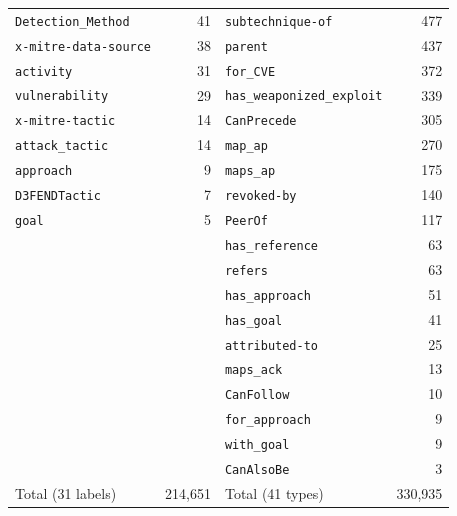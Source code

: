 \documentclass[11pt,a4paper]{article}
\begin{document}
\begin{table}[ht]
\begin{tabular}{@{}lr@{\qquad}lr@{}}
\texttt{Detection\_Method} & 41 & \texttt{subtechnique-of} & 477 \\
\texttt{x-mitre-data-source} & 38 & \texttt{parent} & 437 \\
\texttt{activity} & 31 & \texttt{for\_CVE} & 372 \\
\texttt{vulnerability} & 29 & \texttt{has\_weaponized\_exploit} & 339 \\
\texttt{x-mitre-tactic} & 14 & \texttt{CanPrecede} & 305 \\
\texttt{attack\_tactic} & 14 & \texttt{map\_ap} & 270 \\
\texttt{approach} & 9 & \texttt{maps\_ap} & 175 \\
\texttt{D3FENDTactic} & 7 & \texttt{revoked-by} & 140 \\
\texttt{goal} & 5 & \texttt{PeerOf} & 117 \\
& & \texttt{has\_reference} & 63 \\
& & \texttt{refers} & 63 \\
& & \texttt{has\_approach} & 51 \\
& & \texttt{has\_goal} & 41 \\
& & \texttt{attributed-to} & 25 \\
& & \texttt{maps\_ack} & 13 \\
& & \texttt{CanFollow} & 10 \\
& & \texttt{for\_approach} & 9 \\
& & \texttt{with\_goal} & 9 \\
& & \texttt{CanAlsoBe} & 3 \\
\midrule Total (31 labels) & 214,651 & Total (41 types) & 330,935 \\\bottomrule
\end{tabular}
\end{table}



\end{document}
